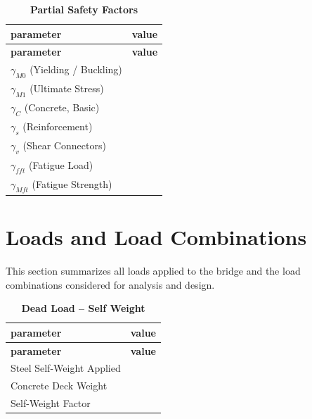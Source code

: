 \documentclass[12pt,a4paper]{report}
\numberwithin{table}{chapter}
\numberwithin{figure}{chapter}
\newcommand{\reportrowpad}{4pt}
\newcommand{\reportsectiongap}{0.75em}
\newcommand{\reportsmallgap}{0.4em}
\begin{document}
\vspace{\reportsmallgap}
\begin{longtable}{|L{5.5cm}|p{10.0cm}|}
\caption{\textbf{Partial Safety Factors}}\\
\hline
\textbf{parameter} & \textbf{value} \\
\hline
\endfirsthead
\hline
\textbf{parameter} & \textbf{value} \\
\hline
\endhead
\textnormal{$\gamma_{M0}$ (Yielding / Buckling)} &  \\[\reportrowpad]
\hline
\textnormal{$\gamma_{M1}$ (Ultimate Stress)} &  \\[\reportrowpad]
\hline
\textnormal{$\gamma_C$ (Concrete, Basic)} &  \\[\reportrowpad]
\hline
\textnormal{$\gamma_s$ (Reinforcement)} &  \\[\reportrowpad]
\hline
\textnormal{$\gamma_v$ (Shear Connectors)} &  \\[\reportrowpad]
\hline
\textnormal{$\gamma_{fft}$ (Fatigue Load)} &  \\[\reportrowpad]
\hline
\textnormal{$\gamma_{Mft}$ (Fatigue Strength)} &  \\[\reportrowpad]
\hline
\end{longtable}


\chapter{Loads and Load Combinations}

This section summarizes all loads applied to the bridge and the load combinations considered for analysis and design.

\vspace{\reportsectiongap}
\begin{longtable}{|L{5.5cm}|p{10.0cm}|}
\caption{\textbf{Dead Load -- Self Weight}}\\
\hline
\textbf{parameter} & \textbf{value} \\
\hline
\endfirsthead
\hline
\textbf{parameter} & \textbf{value} \\
\hline
\endhead
\textnormal{Steel Self-Weight Applied} &  \\[\reportrowpad]
\hline
\textnormal{Concrete Deck Weight} &  \\[\reportrowpad]
\hline
\textnormal{Self-Weight Factor} &  \\[\reportrowpad]
\hline
\end{longtable}
\end{document}
